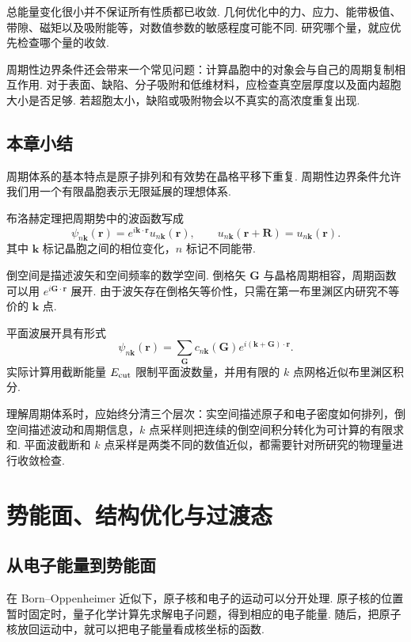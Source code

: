 \documentclass[UTF8,11pt,a4paper,openany]{ctexbook}
\begin{document}
\begin{limitbox}
总能量变化很小并不保证所有性质都已收敛. 几何优化中的力、应力、能带极值、带隙、磁矩以及吸附能等，对数值参数的敏感程度可能不同. 研究哪个量，就应优先检查哪个量的收敛. 
\end{limitbox}

周期性边界条件还会带来一个常见问题：计算晶胞中的对象会与自己的周期复制相互作用. 对于表面、缺陷、分子吸附和低维材料，应检查真空层厚度以及面内超胞大小是否足够. 若超胞太小，缺陷或吸附物会以不真实的高浓度重复出现. 

\section{本章小结}

周期体系的基本特点是原子排列和有效势在晶格平移下重复. 周期性边界条件允许我们用一个有限晶胞表示无限延展的理想体系. 

布洛赫定理把周期势中的波函数写成
\[
\psi_{n\mathbf k}(\mathbf r)
=
e^{i\mathbf k\cdot\mathbf r}
u_{n\mathbf k}(\mathbf r),
\qquad
u_{n\mathbf k}(\mathbf r+\mathbf R)
=
u_{n\mathbf k}(\mathbf r).
\]
其中 $\mathbf k$ 标记晶胞之间的相位变化，$n$ 标记不同能带. 

倒空间是描述波矢和空间频率的数学空间. 倒格矢 $\mathbf G$ 与晶格周期相容，周期函数可以用 $e^{i\mathbf G\cdot\mathbf r}$ 展开. 由于波矢存在倒格矢等价性，只需在第一布里渊区内研究不等价的 $\mathbf k$ 点. 

平面波展开具有形式
\[
\psi_{n\mathbf k}(\mathbf r)
=
\sum_{\mathbf G}
c_{n\mathbf k}(\mathbf G)
e^{i(\mathbf k+\mathbf G)\cdot\mathbf r}.
\]
实际计算用截断能量 $E_{\rm cut}$ 限制平面波数量，并用有限的 $k$ 点网格近似布里渊区积分. 

理解周期体系时，应始终分清三个层次：实空间描述原子和电子密度如何排列，倒空间描述波动和周期信息，$k$ 点采样则把连续的倒空间积分转化为可计算的有限求和. 平面波截断和 $k$ 点采样是两类不同的数值近似，都需要针对所研究的物理量进行收敛检查. 
\chapter{势能面、结构优化与过渡态}

\section{从电子能量到势能面}

在 Born--Oppenheimer 近似下，原子核和电子的运动可以分开处理. 原子核的位置暂时固定时，量子化学计算先求解电子问题，得到相应的电子能量. 随后，把原子核放回运动中，就可以把电子能量看成核坐标的函数. 
\end{document}
